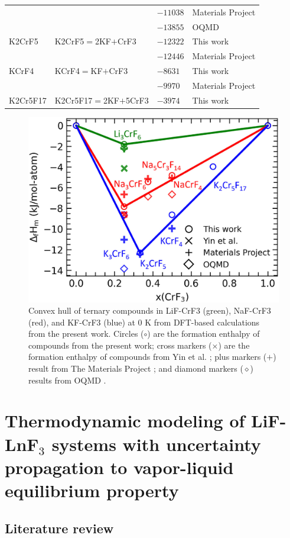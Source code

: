 \begin{table}[H]
\begin{tabular}{>{\raggedright\arraybackslash}m{2.5cm}>{\raggedright\arraybackslash}m{5cm}>{\raggedright\arraybackslash}m{3cm}>{\raggedright\arraybackslash}m{5cm}}
    &&$-11038$&Materials Project \cite{jain2013commentary}\\
	&&$-13855$&OQMD \cite{kirklin2015open}\\
    K2CrF5&K2CrF5$=$2KF$+$CrF3&$-12322$&This work\\
	&&$-12446$&Materials Project \cite{jain2013commentary}\\
    KCrF4&KCrF4$=$KF$+$CrF3&$-8631$&This work\\
    &&$-9970$&Materials Project \cite{jain2013commentary}\\
    K2Cr5F17&K2Cr5F17$=$2KF$+$5CrF3&$-3974$&This work\\
    \hline
    \end{tabular}
    \label{ms:tab:FLiNaK-Cr-Hf}
\end{table}

\begin{figure}[H]
    \centering
    \includegraphics[width=0.5\linewidth]{moltensalts/Moltensalts-FLiNaKCr-DFTHf.jpg}
    \caption{Convex hull of ternary compounds in LiF-CrF3 (green), NaF-CrF3 (red), and KF-CrF3 (blue) at 0 K from DFT-based calculations from the present work. Circles ($\circ$) are the formation enthalpy of compounds from the present work; cross markers ($\times$) are the formation enthalpy of compounds from Yin et al. \cite{yin2018thermodynamic, yin2014thermodynamic}; plus markers ($+$) result from The Materials Project \cite{jain2013commentary}; and diamond markers ($\diamond$) results from OQMD \cite{kirklin2015open}. }
    \label{ms:fig:FLiNaKCr-Hf}
\end{figure}



\section{Thermodynamic modeling of LiF-LnF${_3}$ systems with uncertainty propagation to vapor-liquid equilibrium property} \label{moltensalts:sec:LiFLnF3}

\subsection{Literature review} \label{moltensalts:ssec:LiFLnF3lit}


